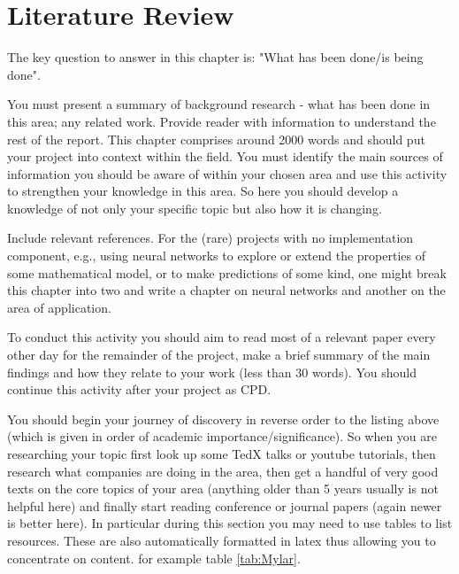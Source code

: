 \chapter{Literature Review}
\label{chap:litreview}
The key question to answer in this chapter is: "What has been done/is being done". 

You must present a summary of background research - what has been done in this area; any related work. Provide reader with information to understand the rest of the report. This chapter comprises around 2000 words and should put your project into context within the field. You must identify the main sources of information you should be aware of within your chosen area and use this activity to strengthen your knowledge in this area. So here you should develop a knowledge of not only your specific topic but also how it is changing. 

Include relevant references. For the (rare) projects with no implementation component, e.g., using neural networks to explore or extend the properties of some mathematical model, or to make predictions of some kind, one might break this chapter into two and write a chapter on neural networks and another on the area of application.

To conduct this activity you should aim to read most of a relevant paper every other day for the remainder of the project, make a brief summary of the main findings and how they relate to your work (less than 30 words). You should continue this activity after your project as CPD.

You should begin your journey of discovery in reverse order to the listing above (which is given in order of academic importance/significance). So when you are researching your topic first look up some TedX talks or youtube tutorials, then research what companies are doing in the area, then get a handful of very good texts on the core topics of your area (anything older than 5 years usually is not helpful here) and finally start reading conference or journal papers (again newer is better here). In particular during this section you may need to use tables to list resources. These are also automatically formatted in latex thus allowing you to concentrate on content. for example table \ref{tab:Mylar}.

